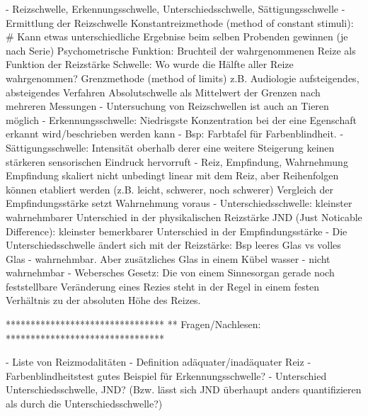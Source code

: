 - Reizschwelle, Erkennungsschwelle, Unterschiedsschwelle, Sättigungsschwelle
- Ermittlung der Reizschwelle
    Konstantreizmethode (method of constant stimuli): #
        Kann etwas unterschiedliche Ergebnise beim selben Probenden gewinnen (je nach Serie)
        Psychometrische Funktion: Bruchteil der wahrgenommenen Reize als Funktion der Reizstärke
        Schwelle: Wo wurde die Hälfte aller Reize wahrgenommen?
    Grenzmethode (method of limits)
        z.B. Audiologie
        aufsteigendes, absteigendes Verfahren
        Absolutschwelle als Mittelwert der Grenzen nach mehreren Messungen
- Untersuchung von Reizschwellen ist auch an Tieren möglich
- Erkennungsschwelle: Niedrisgste Konzentration bei der eine Egenschaft erkannt wird/beschrieben werden kann
- Bsp: Farbtafel für Farbenblindheit.
- Sättigungsschwelle: Intensität oberhalb derer eine weitere Steigerung keinen stärkeren sensorischen Eindruck hervorruft
- Reiz, Empfindung, Wahrnehmung
    Empfindung skaliert nicht unbedingt linear mit dem Reiz, aber Reihenfolgen können etabliert werden (z.B. leicht, schwerer, noch schwerer)
    Vergleich der Empfindungsstärke setzt Wahrnehmung voraus
- Unterschiedsschwelle: kleinster wahrnehmbarer Unterschied in der physikalischen Reizstärke
    JND (Just Noticable Difference): kleinster bemerkbarer Unterschied in der Empfindungsstärke
- Die Unterschiedsschwelle ändert sich mit der Reizstärke: Bsp leeres Glas vs volles Glas - wahrnehmbar. Aber zusätzliches Glas in einem Kübel wasser - nicht wahrnehmbar
- Webersches Gesetz: Die von einem Sinnesorgan gerade noch feststellbare Veränderung eines Rezies steht in der Regel in einem festen Verhältnis zu der absoluten Höhe des Reizes.





********************************
** Fragen/Nachlesen:
********************************

- Liste von Reizmodalitäten
- Definition adäquater/inadäquater Reiz
- Farbenblindheitstest gutes Beispiel für Erkennungsschwelle?
- Unterschied Unterschiedsschwelle, JND? (Bzw. lässt sich JND überhaupt anders quantifizieren als durch die Unterschiedsschwelle?) 